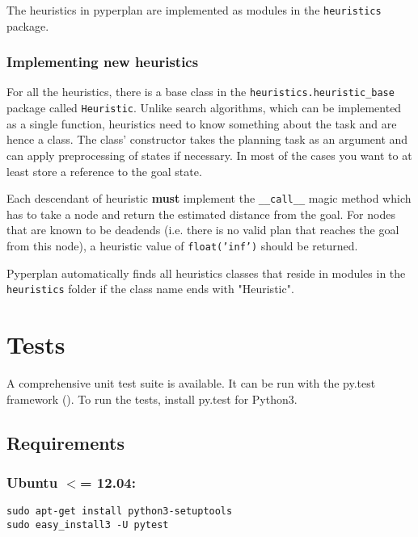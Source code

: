 \documentclass{article}
\begin{document}
The heuristics in pyperplan are implemented as modules in the \texttt{heuristics}
package.

\hypertarget{toc15}{}
\subsubsection{Implementing new heuristics}

For all the heuristics, there is a base class in the
\texttt{heuristics.heuristic\_base} package called \texttt{Heuristic}. Unlike search
algorithms, which can be implemented as a single function, heuristics need
to know something about the task and are hence a class. The class' constructor
takes the planning task as an argument and can apply preprocessing of states if
necessary. In most of the cases you want to at least store a reference to the
goal state.

Each descendant of heuristic \textbf{must} implement the \texttt{\_\_call\_\_} magic method
which has to take a node and return the estimated distance from the goal.
For nodes that are known to be deadends (i.e. there is no valid plan that
reaches the goal from this node), a heuristic value of \texttt{float('inf')} should
be returned.

Pyperplan automatically finds all heuristics classes that reside in modules
in the \texttt{heuristics} folder if the class name ends with "Heuristic".


\hypertarget{toc16}{}
\section{Tests}

A comprehensive unit test suite is available. It can be run with the py.test
framework (). To run the tests, install py.test for Python3.

\hypertarget{toc17}{}
\subsection{Requirements}

\hypertarget{toc18}{}
\subsubsection*{Ubuntu $<$= 12.04:}

\begin{verbatim}
sudo apt-get install python3-setuptools
sudo easy_install3 -U pytest
\end{verbatim}
\end{document}
